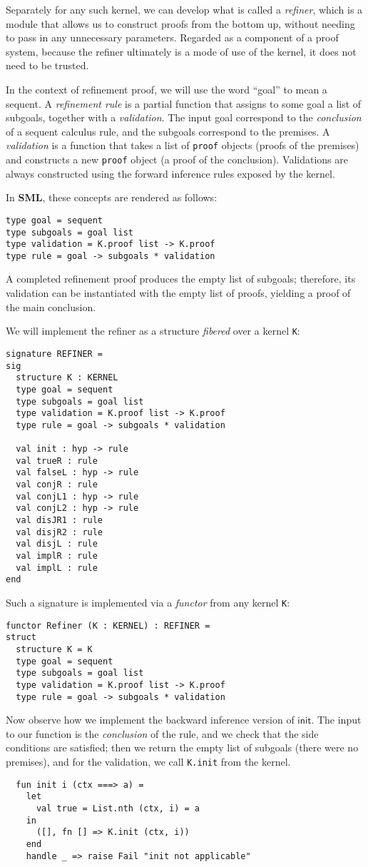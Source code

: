 \documentclass{article}
\newcommand\FormatLang[1]{{\bfseries\sffamily #1}}
\newcommand\SML{\FormatLang{SML}}
\newcommand\RuleInit{\mathsf{init}}
\theoremstyle{definition}
\theoremstyle{remark}
\begin{document}
Separately for any such kernel, we can develop what is called a
\emph{refiner}, which is a module that allows us to construct proofs
from the bottom up, without needing to pass in any unnecessary
parameters. Regarded as a component of a proof system, because the
refiner ultimately is a mode of use of the kernel, it does not need to
be trusted.

In the context of refinement proof, we will use the word ``goal'' to
mean a sequent. A \emph{refinement rule} is a partial function that
assigns to some goal a list of subgoals, together with a
\emph{validation}. The input goal correspond to the \emph{conclusion}
of a sequent calculus rule, and the subgoals correspond to the
premises. A \emph{validation} is a function that takes a list of
\verb|proof| objects (proofs of the premises) and constructs a new
\verb|proof| object (a proof of the conclusion). Validations are
always constructed using the forward inference rules exposed by the
kernel.


In \SML{}, these concepts are rendered as follows:
\begin{verbatim}
type goal = sequent
type subgoals = goal list
type validation = K.proof list -> K.proof
type rule = goal -> subgoals * validation
\end{verbatim}

A completed refinement proof produces the empty list of subgoals;
therefore, its validation can be instantiated with the empty list of
proofs, yielding a proof of the main conclusion.

We will implement the refiner as a structure \emph{fibered} over a
kernel \verb|K|:
\begin{verbatim}
signature REFINER =
sig
  structure K : KERNEL
  type goal = sequent
  type subgoals = goal list
  type validation = K.proof list -> K.proof
  type rule = goal -> subgoals * validation

  val init : hyp -> rule
  val trueR : rule
  val falseL : hyp -> rule
  val conjR : rule
  val conjL1 : hyp -> rule
  val conjL2 : hyp -> rule
  val disJR1 : rule
  val disjR2 : rule
  val disjL : rule
  val implR : rule
  val implL : rule
end
\end{verbatim}

Such a signature is implemented via a \emph{functor} from any kernel
\verb|K|:
\begin{verbatim}
functor Refiner (K : KERNEL) : REFINER =
struct
  structure K = K
  type goal = sequent
  type subgoals = goal list
  type validation = K.proof list -> K.proof
  type rule = goal -> subgoals * validation
\end{verbatim}
Now observe how we implement the backward inference version of
$\RuleInit$. The input to our function is the \emph{conclusion} of the
rule, and we check that the side conditions are satisfied; then we
return the empty list of subgoals (there were no premises), and for
the validation, we call \verb|K.init| from the kernel.
\begin{verbatim}
  fun init i (ctx ===> a) =
    let
      val true = List.nth (ctx, i) = a
    in
      ([], fn [] => K.init (ctx, i))
    end
    handle _ => raise Fail "init not applicable"
\end{verbatim}
\end{document}
